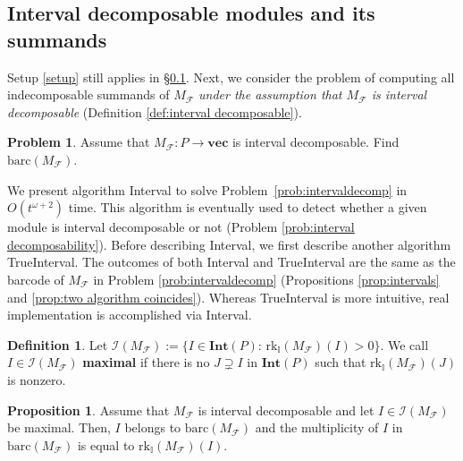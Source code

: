 \documentclass[11pt]{article}
\theoremstyle{definition}
\newtheorem{proposition}[theorem]{Proposition}
\newtheorem{definition}[theorem]{Definition}
\newtheorem{problem}[theorem]{Problem}
\newcommand{\intrk}{\mathrm{rk}_{\mathbb{I}}}
\newcommand{\Int}{\mathbf{Int}}
\newcommand{\Pb}{P}
\newcommand{\vect}{\mathbf{vec}}
\newcommand{\Fcal}{\mathcal{F}}
\newcommand{\NN}{t}
\newcommand{\barc}{\mathrm{barc}}
\begin{document}
\subsection{Interval decomposable modules and its summands}\label{sec:Interval decomposable modules and its summands}
Setup \ref{setup} still applies in \S\ref{sec:Interval decomposable modules and its summands}. Next, we consider the problem of computing all indecomposable summands of $M_\Fcal$ \emph{under the assumption that $M_\Fcal$ is interval decomposable} (Definition \ref{def:interval decomposable}). 

\begin{problem}\label{prob:compute summands of interval decomposable modules}
Assume that $M_{\Fcal}:\Pb\rightarrow \vect$ is interval decomposable. Find $\barc(M_{\Fcal})$.
\label{prob:intervaldecomp}
\end{problem}
We present algorithm {\sc Interval} to solve Problem~\ref{prob:intervaldecomp} in $O(\NN^{\omega+2})$ time. This
algorithm is eventually used to detect whether a given module is interval decomposable or not (Problem \ref{prob:interval decomposability}).
%
%
Before describing {\sc Interval}, we first describe another algorithm {\sc TrueInterval}. The outcomes of both {\sc Interval} and {\sc TrueInterval} are the same as the barcode of $M_\Fcal$ in Problem \ref{prob:intervaldecomp} (Propositions \ref{prop:intervals} and \ref{prop:two algorithm coincides}). Whereas {\sc TrueInterval} is more intuitive, real implementation is accomplished via {\sc Interval}. 




\begin{definition}\label{def:maximal support interval}
Let $\mathcal{I}(M_{\Fcal}):=\{I\in\Int(\Pb):\,\intrk(M_{\Fcal})(I)>0\}$. We call $I\in\mathcal{I}(M_{\Fcal})$  \textbf{maximal} if there is no $J\supsetneq I$ in $\Int(\Pb)$ such that $\intrk(M_{\Fcal})(J)$ is nonzero.
\end{definition}

\begin{proposition}\label{prop:maximal intervals}\label{prop:maxI}
Assume that $M_\Fcal$ is interval decomposable and let $I\in \mathcal{I}(M_{\Fcal})$ be maximal. Then, $I$ belongs to $\barc(M_{\Fcal})$ and the multiplicity of $I$ in $\barc(M_{\Fcal})$ is equal to $\intrk(M_{\Fcal})(I)$.
\end{proposition}
\end{document}
